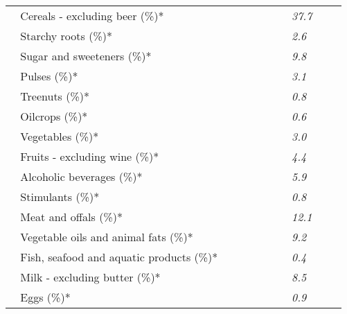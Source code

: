 \begin{tabular}{L{3.9cm} R{1cm} R{1cm} R{1cm}}
	 ~ Cereals - excluding beer (\%)* &  ~ \ \ &  ~ \ \ & \textit{37.7} ~ \ \ \\ 
	 ~ Starchy roots (\%)* &  ~ \ \ &  ~ \ \ & \textit{2.6} ~ \ \ \\ 
	 ~ Sugar and sweeteners (\%)* &  ~ \ \ &  ~ \ \ & \textit{9.8} ~ \ \ \\ 
	 ~ Pulses (\%)* &  ~ \ \ &  ~ \ \ & \textit{3.1} ~ \ \ \\ 
	 ~ Treenuts (\%)* &  ~ \ \ &  ~ \ \ & \textit{0.8} ~ \ \ \\ 
	 ~ Oilcrops (\%)* &  ~ \ \ &  ~ \ \ & \textit{0.6} ~ \ \ \\ 
	 ~ Vegetables (\%)* &  ~ \ \ &  ~ \ \ & \textit{3.0} ~ \ \ \\ 
	 ~ Fruits - excluding wine (\%)* &  ~ \ \ &  ~ \ \ & \textit{4.4} ~ \ \ \\ 
	 ~ Alcoholic beverages (\%)* &  ~ \ \ &  ~ \ \ & \textit{5.9} ~ \ \ \\ 
	 ~ Stimulants (\%)* &  ~ \ \ &  ~ \ \ & \textit{0.8} ~ \ \ \\ 
	 ~ Meat and offals (\%)* &  ~ \ \ &  ~ \ \ & \textit{12.1} ~ \ \ \\ 
	 ~ Vegetable oils and animal fats (\%)* &  ~ \ \ &  ~ \ \ & \textit{9.2} ~ \ \ \\ 
	 ~ Fish, seafood and aquatic products (\%)* &  ~ \ \ &  ~ \ \ & \textit{0.4} ~ \ \ \\ 
	 ~ Milk - excluding butter (\%)* &  ~ \ \ &  ~ \ \ & \textit{8.5} ~ \ \ \\ 
	 ~ Eggs (\%)* &  ~ \ \ &  ~ \ \ & \textit{0.9} ~ \ \ \\ 
       \toprule
      \end{tabular}
      \clearpage
{}
